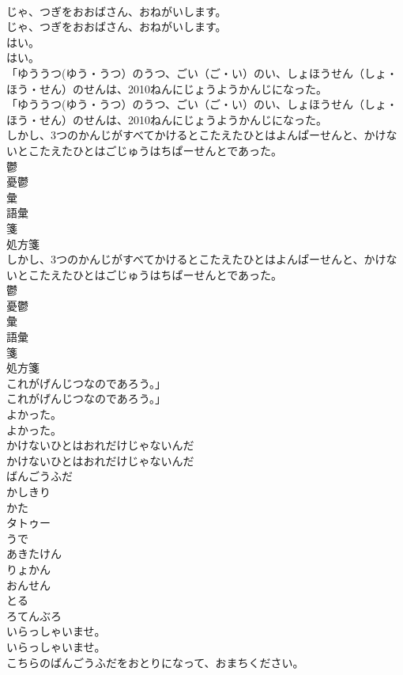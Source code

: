 \documentclass[8pt]{extreport}
\begin{document}
\begin{CJK}{UTF8}{min}
\\	じゃ、つぎをおおばさん、おねがいします。
\\	じゃ、つぎをおおばさん、おねがいします。
\\	はい。
\\	はい。
\\	「ゆううつ(ゆう・うつ）のうつ、ごい（ご・い）のい、しょほうせん（しょ・ほう・せん）のせんは、2010ねんにじょうようかんじになった。
\\	「ゆううつ(ゆう・うつ）のうつ、ごい（ご・い）のい、しょほうせん（しょ・ほう・せん）のせんは、2010ねんにじょうようかんじになった。
\\	しかし、3つのかんじがすべてかけるとこたえたひとはよんぱーせんと、かけないとこたえたひとはごじゅうはちぱーせんとであった。
\\	鬱 
\\	憂鬱 
\\	彙 
\\	語彙 
\\	箋 
\\	処方箋 
\\	しかし、3つのかんじがすべてかけるとこたえたひとはよんぱーせんと、かけないとこたえたひとはごじゅうはちぱーせんとであった。
\\	鬱 
\\	憂鬱 
\\	彙 
\\	語彙 
\\	箋 
\\	処方箋 
\\	これがげんじつなのであろう。」
\\	これがげんじつなのであろう。」
\\	よかった。
\\	よかった。
\\	かけないひとはおれだけじゃないんだ
\\	かけないひとはおれだけじゃないんだ
\\	ばんごうふだ
\\	かしきり
\\	かた
\\	タトゥー
\\	うで
\\	あきたけん
\\	りょかん
\\	おんせん
\\	とる
\\	ろてんぶろ
\\	いらっしゃいませ。
\\	いらっしゃいませ。
\\	こちらのばんごうふだをおとりになって、おまちください。

\end{CJK}
\end{document}
